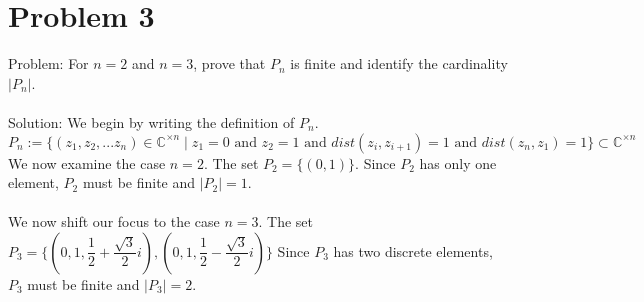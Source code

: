 \documentclass{article}
\begin{document}
\section*{Problem 3}
Problem: For $n = 2$ and $n = 3$, prove that $P_n$ is finite and identify the cardinality $| P_n |$. \\\\
Solution: We begin by writing the definition of $P_n$.
$$ P_n := \{ (z_1, z_2, ... z_n) \in \mathbb{C}^{\times n} \mid z_1 = 0 \text{ and } z_2 = 1 \text{ and } dist(z_i, z_{i+1}) = 1 \text{ and } dist(z_n, z_1) = 1 \} \subset \mathbb{C}^{\times n} $$
We now examine the case $n = 2$. The set $P_2 = \{ (0, 1) \}$. Since $P_2$ has only one element, $P_2$ must be finite and $| P_2 | = 1$. \\\\
We now shift our focus to the case $n = 3$. The set $P_3 = \{ (0, 1, \dfrac{1}{2} + \dfrac{\sqrt{3}}{2}i), (0, 1, \dfrac{1}{2} - \dfrac{\sqrt{3}}{2}i) \}$
Since $P_3$ has two discrete elements, $P_3$ must be finite and $| P_3 | = 2$.

\newpage
\end{document}
